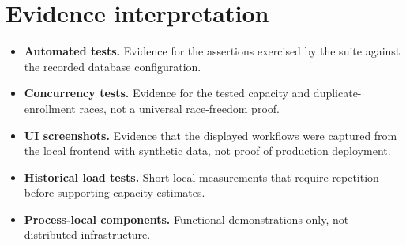 \documentclass[11pt,a4paper,oneside]{report}
\begin{document}
\chapter{Evidence interpretation}
\begin{itemize}
\item \textbf{Automated tests.} Evidence for the assertions exercised by the suite against the recorded database configuration.
\item \textbf{Concurrency tests.} Evidence for the tested capacity and duplicate-enrollment races, not a universal race-freedom proof.
\item \textbf{UI screenshots.} Evidence that the displayed workflows were captured from the local frontend with synthetic data, not proof of production deployment.
\item \textbf{Historical load tests.} Short local measurements that require repetition before supporting capacity estimates.
\item \textbf{Process-local components.} Functional demonstrations only, not distributed infrastructure.
\end{itemize}
\end{document}
